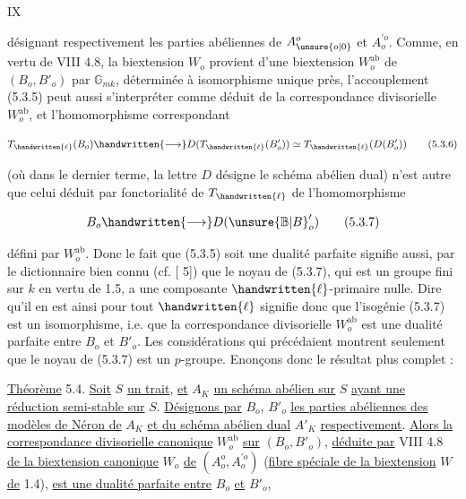 \hfill IX

désignant respectivement les parties abéliennes de $A_{\unsure{o|0}}^o$ et $A^{\prime o}_o$. Comme, en vertu de VIII 4.8, la biextension $W_o$ provient d'une biextension $W_o^{\mathrm{ab}}$ de $(B_o,B'_o)$ par $\mathbb{G}_{mk}$, déterminée à isomorphisme unique près, l'accouplement (5.3.5) peut aussi s'interpréter comme déduit de la correspondance divisorielle $W_o^{\mathrm{ab}}$, et l'homomorphisme correspondant

\[
T_{\handwritten{\ell}}(B_o)\handwritten{\longrightarrow} D(T_{\handwritten{\ell}}(B'_o))\simeq T_{\handwritten{\ell}}(D(B'_o))\tag*{(5.3.6)}
\]

(où dans le dernier terme, la lettre $D$ désigne le schéma abélien dual) n'est autre que celui déduit par fonctorialité de $T_{\handwritten{\ell}}$ de l'homomorphisme

\[
B_o \handwritten{\longrightarrow} D(\unsure{\mathbb{B}|B}'_o)\tag*{(5.3.7)}
\]

défini par $W_o^{\mathrm{ab}}$. Donc le fait que (5.3.5) soit une dualité parfaite signifie aussi, par le dictionnaire bien connu (cf. [ 5]) que le noyau de (5.3.7), qui est un groupe fini sur $k$ en vertu de 1.5, a une composante $\handwritten{\ell}$-primaire nulle. Dire qu'il en est ainsi pour tout $\handwritten{\ell}$ signifie donc que l'isogénie (5.3.7) est un isomorphisme, i.e. que la correspondance divisorielle $W_o^{\mathrm{ab}}$ est une dualité parfaite entre $B_o$ et $B'_o$. Les considérations qui précédaient montrent seulement que le noyau de (5.3.7) est un $p$-groupe. Enonçons donc le résultat plus complet :

\uline{Théorème} 5.4. \uline{Soit} $S$ \uline{un trait}, \uline{et} $A_K$ \uline{un schéma abélien sur} $S$ \uline{ayant une réduction semi-stable sur} $S$. \uline{Désignons par} $B_o$, $B'_o$ \uline{les parties abéliennes des modèles de Néron de} $A_K$ \uline{et du schéma abélien dual} $A'_K$ \uline{respectivement}. \uline{Alors la correspondance divisorielle canonique} $W_o^{\mathrm{ab}}$ \uline{sur} $(B_o,B'_o)$, \uline{déduite par} VIII 4.8 \uline{de la biextension canonique} $W_o$ \uline{de} $(A_o^o,A^{\prime o}_o)$ (\uline{fibre spéciale de la biextension} $W$ \uline{de} 1.4), \uline{est une dualité parfaite entre} $B_o$ \uline{et} $B'_o$,

